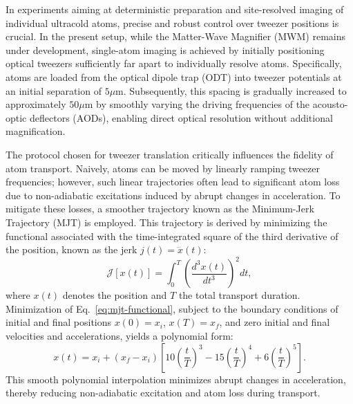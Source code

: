 





In experiments aiming at deterministic preparation and site-resolved imaging of individual ultracold atoms, precise and robust control over tweezer positions is crucial. In the present setup, while the Matter-Wave Magnifier (MWM) remains under development, single-atom imaging is achieved by initially positioning optical tweezers sufficiently far apart to individually resolve atoms. Specifically, atoms are loaded from the optical dipole trap (ODT) into tweezer potentials at an initial separation of $5\mu$m. Subsequently, this spacing is gradually increased to approximately $50\mu$m by smoothly varying the driving frequencies of the acousto-optic deflectors (AODs), enabling direct optical resolution without additional magnification.

The protocol chosen for tweezer translation critically influences the fidelity of atom transport. Naively, atoms can be moved by linearly ramping tweezer frequencies; however, such linear trajectories often lead to significant atom loss due to non-adiabatic excitations induced by abrupt changes in acceleration. To mitigate these losses, a smoother trajectory known as the Minimum-Jerk Trajectory (MJT) is employed. This trajectory is derived by minimizing the functional associated with the time-integrated square of the third derivative of the position, known as the jerk $j(t) = \dddot{x}(t)$:
\begin{equation}
\mathcal{J}[x(t)] = \int_{0}^{T} \left(\frac{d^3 x(t)}{dt^3}\right)^2 dt,
\label{eq:mjt-functional}
\end{equation}
where $x(t)$ denotes the position and $T$ the total transport duration. Minimization of Eq.~\eqref{eq:mjt-functional}, subject to the boundary conditions of initial and final positions $x(0) = x_i$, $x(T) = x_f$, and zero initial and final velocities and accelerations, yields a polynomial form:
\begin{equation}
x(t) = x_i + (x_f - x_i)\left[10\left(\frac{t}{T}\right)^3 - 15\left(\frac{t}{T}\right)^4 + 6\left(\frac{t}{T}\right)^5\right].
\label{eq:mjt-solution}
\end{equation}
This smooth polynomial interpolation minimizes abrupt changes in acceleration, thereby reducing non-adiabatic excitation and atom loss during transport.

